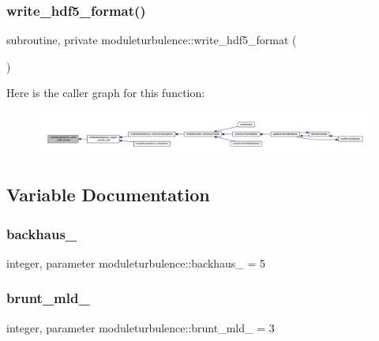 \subsubsection{\texorpdfstring{write\+\_\+hdf5\+\_\+format()}{write\_hdf5\_format()}}
{\footnotesize\ttfamily subroutine, private moduleturbulence\+::write\+\_\+hdf5\+\_\+format (\begin{DoxyParamCaption}{ }\end{DoxyParamCaption})\hspace{0.3cm}{\ttfamily [private]}}

Here is the caller graph for this function\+:\nopagebreak
\begin{figure}[H]
\begin{center}
\leavevmode
\includegraphics[width=350pt]{namespacemoduleturbulence_a256cd0709bb85cc0f9cd463e00938709_icgraph}
\end{center}
\end{figure}


\subsection{Variable Documentation}
\mbox{\label{namespacemoduleturbulence_a2e4474631725c7959668fd9dfe8f90d0}} 
\subsubsection{\texorpdfstring{backhaus\+\_\+}{backhaus\_}}
{\footnotesize\ttfamily integer, parameter moduleturbulence\+::backhaus\+\_\+ = 5\hspace{0.3cm}{\ttfamily [private]}}

\mbox{\label{namespacemoduleturbulence_a8c9c8f005ce1bb83a3e5a8cebd69bae4}} 
\subsubsection{\texorpdfstring{brunt\+\_\+mld\+\_\+}{brunt\_mld\_}}
{\footnotesize\ttfamily integer, parameter moduleturbulence\+::brunt\+\_\+mld\+\_\+ = 3\hspace{0.3cm}{\ttfamily [private]}}

